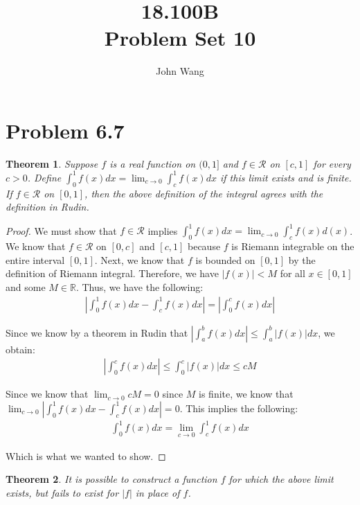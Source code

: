 \documentclass[psamsfonts]{amsart}
\title{18.100B \\
Problem Set 10}
\author{John Wang}
\newtheorem{thm}{Theorem}[section]
\theoremstyle{definition}
\theoremstyle{remark}
\numberwithin{equation}{section}
\begin{document}
\maketitle

\section{Problem 6.7}

\begin{thm}
Suppose $f$ is a real function on $(0,1]$ and $f \in \mathscr{R}$ on $[c,1]$ for every $c > 0$. Define $\int_0^1 f(x) dx = \lim_{c \to 0} \int_c^1 f(x) dx$ if this limit exists and is finite. If $f \in \mathscr{R}$ on $[0,1]$, then the above definition of the integral agrees with the definition in Rudin.
\end{thm}

\begin{proof}
We must show that $f \in \mathscr{R}$ implies $\int_0^1 f(x) dx = \lim_{c \to 0} \int_c^1 f(x) d(x)$. We know that $f \in \mathscr{R}$ on $[0,c]$ and $[c,1]$ because $f$ is Riemann integrable on the entire interval $[0,1]$. Next, we know that $f$ is bounded on $[0,1]$ by the definition of Riemann integral. Therefore, we have $|f(x)| < M$ for all $x \in[0,1]$ and some $M \in \mathbb{R}$. Thus, we have the following:
\begin{eqnarray}
\left| \int_0^1 f(x) dx - \int_c^1 f(x) dx \right|  = \left| \int_0^c f(x) dx \right| 
\end{eqnarray}

Since we know by a theorem in Rudin that $|\int_a^b f(x) dx| \leq \int_a^b |f(x)| dx$, we obtain:
\begin{eqnarray}
\left| \int_0^c f(x) dx \right| \leq \int_0^c |f(x)| dx \leq c M
\end{eqnarray}

Since we know that $\lim_{c \to 0} c M = 0$ since $M$ is finite, we know that $\lim_{c \to 0} | \int_0^1 f(x) dx - \int_c^1 f(x) dx| = 0$. This implies the following:
\begin{eqnarray}
\int_0^1 f(x) dx = \lim_{c \to 0} \int_c^1 f(x) dx 
\end{eqnarray}

Which is what we wanted to show.
\end{proof}

\begin{thm}
It is possible to construct a function $f$ for which the above limit exists, but fails to exist for $|f|$ in place of $f$.
\end{thm}
\end{document}
